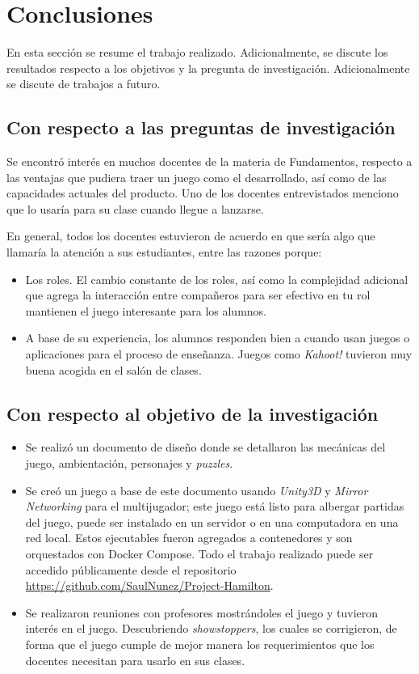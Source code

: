 \chapter{Conclusiones}\label{conclusiones}
 
 En esta sección se resume el trabajo realizado. Adicionalmente, se discute los resultados respecto a los objetivos y la pregunta de investigación. Adicionalmente se discute de trabajos a futuro.
 
\section{Con respecto a las preguntas de investigación}

Se encontró interés en muchos docentes de la materia de Fundamentos, respecto a las ventajas que pudiera traer un juego como el desarrollado, así como de las capacidades actuales del producto. Uno de los docentes entrevistados menciono que lo usaría para su clase cuando llegue a lanzarse. 

En general, todos los docentes estuvieron de acuerdo en que sería algo que llamaría la atención a sus estudiantes, entre las razones porque:
\begin{itemize}
    \item Los roles. El cambio constante de los roles, así como la complejidad adicional que agrega la interacción entre compañeros para ser efectivo en tu rol mantienen el juego interesante para los alumnos.
    \item A base de su experiencia, los alumnos responden bien a cuando usan juegos o aplicaciones para el proceso de enseñanza. Juegos como \textit{Kahoot!} tuvieron muy buena acogida  en el salón de clases.
\end{itemize}

\section{Con respecto al objetivo de la investigación}
\begin{itemize}
    \item Se realizó un documento de diseño donde se detallaron las mecánicas del juego, ambientación, personajes y \textit{puzzles}.
    \item Se creó un juego a base de este documento usando \textit{Unity3D} y \textit{Mirror Networking} para el multijugador; este juego está listo para albergar partidas del juego, puede ser instalado en un servidor o en una computadora en una red local. Estos ejecutables fueron agregados a contenedores y son orquestados con Docker Compose. Todo el trabajo realizado puede ser accedido públicamente desde el repositorio  \url{https://github.com/SaulNunez/Project-Hamilton}.
    \item Se realizaron reuniones con profesores mostrándoles el juego y tuvieron interés en el juego. Descubriendo \textit{showstoppers}, los cuales se corrigieron, de forma que el juego cumple de mejor manera los requerimientos que los docentes necesitan para usarlo en sus clases.
\end{itemize}

